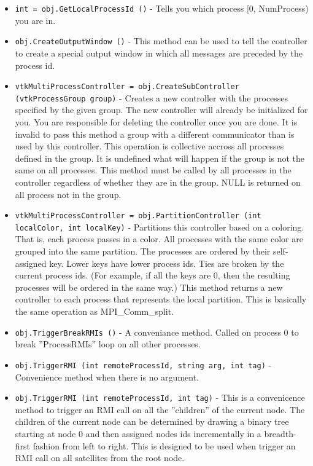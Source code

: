 \begin{itemize}
\item  \verb|int = obj.GetLocalProcessId ()| -  Tells you which process [0, NumProcess) you are in.

\item  \verb|obj.CreateOutputWindow ()| -  This method can be used to tell the controller to create
 a special output window in which all messages are preceded
 by the process id.

\item  \verb|vtkMultiProcessController = obj.CreateSubController (vtkProcessGroup group)| -  Creates a new controller with the processes specified by the given group.
 The new controller will already be initialized for you.  You are
 responsible for deleting the controller once you are done.  It is invalid
 to pass this method a group with a different communicator than is used by
 this controller.  This operation is collective accross all processes
 defined in the group.  It is undefined what will happen if the group is not
 the same on all processes.  This method must be called by all processes in
 the controller regardless of whether they are in the group.  NULL is
 returned on all process not in the group.

\item  \verb|vtkMultiProcessController = obj.PartitionController (int localColor, int localKey)| -  Partitions this controller based on a coloring.  That is, each process
 passes in a color.  All processes with the same color are grouped into the
 same partition.  The processes are ordered by their self-assigned key.
 Lower keys have lower process ids.  Ties are broken by the current process
 ids.  (For example, if all the keys are 0, then the resulting processes
 will be ordered in the same way.)  This method returns a new controller to
 each process that represents the local partition.  This is basically the
 same operation as MPI\_Comm\_split.

\item  \verb|obj.TriggerBreakRMIs ()| -  A conveniance method.  Called on process 0 to break ''ProcessRMIs'' loop
 on all other processes.

\item  \verb|obj.TriggerRMI (int remoteProcessId, string arg, int tag)| -  Convenience method when there is no argument.

\item  \verb|obj.TriggerRMI (int remoteProcessId, int tag)| -  This is a convenicence method to trigger an RMI call on all the ''children''
 of the current node. The children of the current node can be determined by
 drawing a binary tree starting at node 0 and then assigned nodes ids
 incrementally in a breadth-first fashion from left to right. This is
 designed to be used when trigger an RMI call on all satellites from the
 root node.


\end{itemize}
